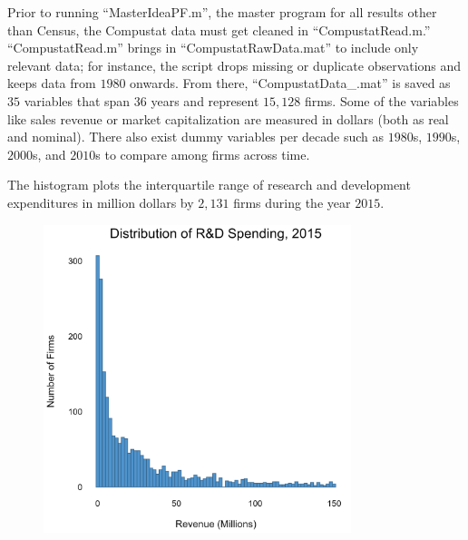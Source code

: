 \documentclass[11pt]{amsart}
\begin{document}
\bigskip

\bigskip


\smallskip

\noindent Prior to running ``MasterIdeaPF.m'', the master program for all results other than Census, the Compustat data must get cleaned in ``CompustatRead.m.'' ``CompustatRead.m'' brings in ``CompustatRawData.mat'' to include only relevant data; for instance, the script drops missing or duplicate observations and keeps data from $1980$ onwards. From there, ``CompustatData\_.mat'' is saved as $35$ variables that span $36$ years and represent $15,128$ firms. Some of the variables like sales revenue or market capitalization are measured in dollars (both as real and nominal). There also exist dummy variables per decade such as $1980$s, $1990$s, $2000$s, and $2010$s to compare among firms across time. 

\newpage


\smallskip

\noindent The histogram plots the interquartile range of research and development expenditures in million dollars by $2,131$ firms during the year $2015$. 

\begin{figure}[h]
    \centering 
    \includegraphics[width=0.8\textwidth]{histogram.png}  
    \label{fig:histogram} 
\end{figure}

\noindent
\end{document}
